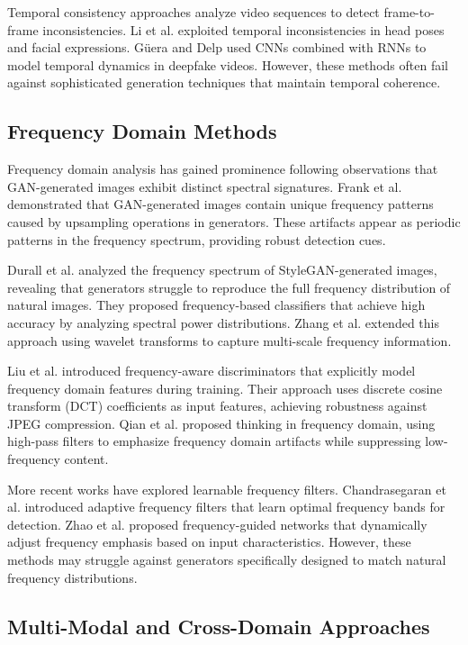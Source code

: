 \documentclass[letterpaper]{article} %
\begin{document}
Temporal consistency approaches analyze video sequences to detect frame-to-frame inconsistencies. Li et al. exploited temporal inconsistencies in head poses and facial expressions. Güera and Delp used CNNs combined with RNNs to model temporal dynamics in deepfake videos. However, these methods often fail against sophisticated generation techniques that maintain temporal coherence.

\subsection{Frequency Domain Methods}

Frequency domain analysis has gained prominence following observations that GAN-generated images exhibit distinct spectral signatures. Frank et al. demonstrated that GAN-generated images contain unique frequency patterns caused by upsampling operations in generators. These artifacts appear as periodic patterns in the frequency spectrum, providing robust detection cues.

Durall et al. analyzed the frequency spectrum of StyleGAN-generated images, revealing that generators struggle to reproduce the full frequency distribution of natural images. They proposed frequency-based classifiers that achieve high accuracy by analyzing spectral power distributions. Zhang et al. extended this approach using wavelet transforms to capture multi-scale frequency information.

Liu et al. introduced frequency-aware discriminators that explicitly model frequency domain features during training. Their approach uses discrete cosine transform (DCT) coefficients as input features, achieving robustness against JPEG compression. Qian et al. proposed thinking in frequency domain, using high-pass filters to emphasize frequency domain artifacts while suppressing low-frequency content.

More recent works have explored learnable frequency filters. Chandrasegaran et al. introduced adaptive frequency filters that learn optimal frequency bands for detection. Zhao et al. proposed frequency-guided networks that dynamically adjust frequency emphasis based on input characteristics. However, these methods may struggle against generators specifically designed to match natural frequency distributions.

\subsection{Multi-Modal and Cross-Domain Approaches}
\end{document}
